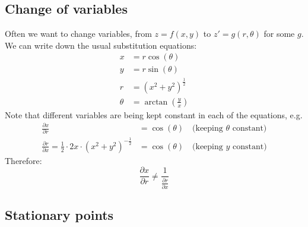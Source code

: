 \documentclass{scrartcl}
\begin{document}
\subsection{Change of variables}

Often we want to change variables, from $ z = f(x, y) $ to $ z' = g(r, \theta) $ for some $ g $. We can write down the usual substitution equations:
\begin{align}
x & = r \cos(\theta) \\
y & = r \sin(\theta) \\
r & = (x^{2} + y^{2})^{\frac{1}{2}} \\
\theta & = \arctan(\frac{y}{x})
\end{align}
Note that different variables are being kept constant in each of the equations, e.g.
\begin{align}
\frac{\partial x}{\partial r} & = \cos(\theta) \quad \textrm{(keeping } \theta \textrm{ constant)} \\
\frac{\partial r}{\partial x} = \frac{1}{2} \cdot 2x \cdot (x^{2} + y^{2})^{-\frac{1}{2}} & = \cos(\theta) \quad \textrm{(keeping } y \textrm{ constant)}
\end{align}
Therefore:
\begin{equation}
\frac{\partial x}{\partial r} \neq \frac{1}{\frac{\partial r}{\partial x}}
\end{equation}

\subsection{Stationary points}
\end{document}
